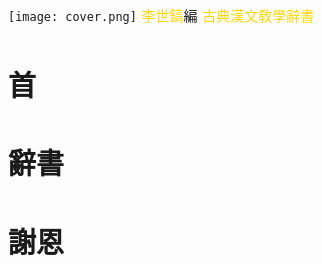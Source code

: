 \documentclass[a5paper,12pt]{report}
\begin{document}
\begin{titlepage}
\hfill
\vfill
\hspace{-40mm}
\texttt{[image: cover.png]}
\vfill
{\fontsize{14pt}{14pt}\selectfont\textcolor{gold}{李世鎬}\hspace{24pt}編}
\vspace{24pt}\newline
{\fontsize{36pt}{36pt}\selectfont\textcolor{gold}{\hspace{48pt}古典漢文敎學辭書}}
\vfill
\end{titlepage}
\newpage
\chapter*{首}
\onehalfspacing


\chapter*{辭書}
\setlength\columnsep{24pt}
\begin{multicols}{2}
\onehalfspacing

\end{multicols}

\chapter*{謝恩}
\onehalfspacing

\end{document}
